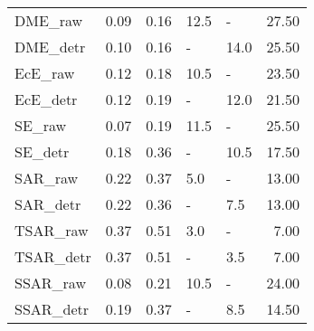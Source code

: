 \begin{tabular}{lllllr}
\midrule
DME\_raw & 0.09 & 0.16 & 12.5 & - & 27.50 \\
DME\_detr & 0.10 & 0.16 & - & 14.0 & 25.50 \\
\midrule
EcE\_raw & 0.12 & 0.18 & 10.5 & - & 23.50 \\
EcE\_detr & 0.12 & 0.19 & - & 12.0 & 21.50 \\
\midrule
SE\_raw & 0.07 & 0.19 & 11.5 & - & 25.50 \\
SE\_detr & 0.18 & 0.36 & - & 10.5 & 17.50 \\
\midrule
SAR\_raw & 0.22 & 0.37 & 5.0 & - & 13.00 \\
SAR\_detr & 0.22 & 0.36 & - & 7.5 & 13.00 \\
\midrule
TSAR\_raw & 0.37 & 0.51 & 3.0 & - & 7.00 \\
TSAR\_detr & 0.37 & 0.51 & - & 3.5 & 7.00 \\
\midrule
SSAR\_raw & 0.08 & 0.21 & 10.5 & - & 24.00 \\
SSAR\_detr & 0.19 & 0.37 & - & 8.5 & 14.50 \\
\midrule
\bottomrule
\end{tabular}
\midrule
